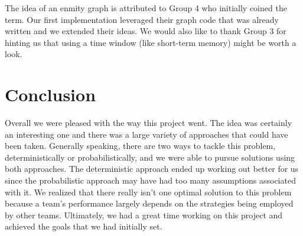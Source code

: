 \documentclass[
10pt, %
letterpaper, %
oneside, %
headinclude,footinclude, %
english
]{article}
\begin{document}
The idea of an enmity graph is attributed to Group 4 who initially coined the term. Our first implementation leveraged their graph code that was already written and we extended their ideas. We would also like to thank Group 3 for hinting us that using a time window (like short-term memory) might be worth a look.

\section{Conclusion}

Overall we were pleased with the way this project went. The idea was certainly an interesting one and there was a large variety of approaches that could have been taken. Generally speaking, there are two ways to tackle this problem, deterministically or probabilistically, and we were able to pursue solutions using both approaches. The deterministic approach ended up working out better for us since the probabilistic approach may have had too many assumptions associated with it. We realized that there really isn't one optimal solution to this problem because a team's performance largely depends on the strategies being employed by other teams. Ultimately, we had a great time working on this project and achieved the goals that we had initially set. 
\end{document}
